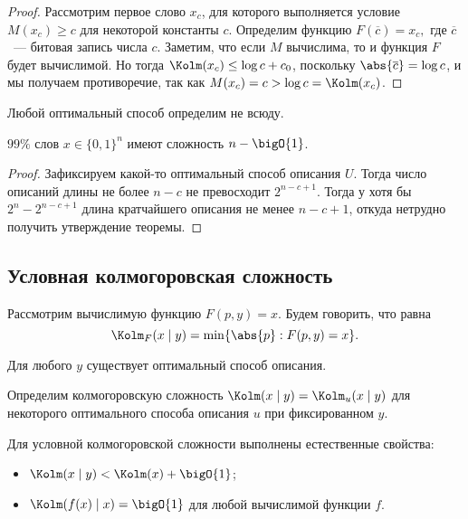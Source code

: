 \begin{proof}
    Рассмотрим первое слово $x_c$, для которого выполняется условие $M(x_c) \ge c$ для некоторой
    константы $c$. Определим функцию $F(\overline{c}) = x_c,$ где $\overline{c}$~--- битовая запись числа
    $c$. Заметим, что если $M$ вычислима, то и функция $F$ будет вычислимой. Но тогда $\Kolm(x_c) \le
    \log c + c_0$, поскольку $\abs{\overline{c}} = \log c$, и мы получаем противоречие, так как
    $M(x_c) = c > \log c = \Kolm(x_c)$. 
\end{proof}

\begin{corollary}
    Любой оптимальный способ определим не всюду.
\end{corollary}

\begin{theorem}
    \label{th:99-words}
    $99\%$ слов $x \in \{0, 1\}^n$ имеют сложность $n - \bigO{1}$. 
\end{theorem}

\begin{proof}
    Зафиксируем какой-то оптимальный способ описания $U$. Тогда число описаний длины не более $n - c$ не
    превосходит $2^{n - c + 1}$. Тогда у хотя бы $2^{n} - 2^{n - c + 1}$ длина кратчайшего описания не
    менее $n - c + 1$, откуда нетрудно получить утверждение теоремы.
\end{proof}


\subsection{Условная колмогоровская сложность}

Рассмотрим вычислимую функцию $F(p, y) = x$. Будем говорить, что
 равна 
$$
    \Kolm_F(x \mid y) = \min\{\abs{p} : F(p, y) = x \}.
$$ 

\begin{theorem}
    Для любого $y$ существует оптимальный способ описания.
\end{theorem}

\begin{definition}
    Определим колмогоровскую сложность $\Kolm(x \mid y) = \Kolm_u(x \mid y)$ для некоторого оптимального
    способа описания $u$ при фиксированном $y$.
\end{definition}

Для условной колмогоровской сложности выполнены естественные свойства:
\begin{itemize}
    \item $\Kolm(x \mid y) < \Kolm(x) + \bigO{1}$;
    \item $\Kolm(f(x) \mid x) = \bigO{1}$ для любой вычислимой функции $f$.
\end{itemize}

